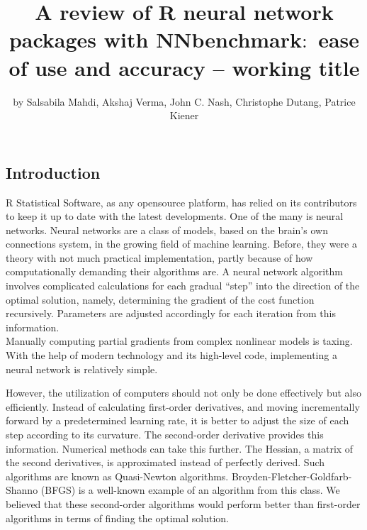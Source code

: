 \title{A review of R neural network packages with NNbenchmark\(:\) ease of use
and accuracy -- working title}
\author{by Salsabila Mahdi, Akshaj Verma, John C. Nash, Christophe Dutang, Patrice Kiener}

\maketitle


\hypertarget{introduction}{%
\subsection{Introduction}\label{introduction}}

R Statistical Software, as any opensource platform, has relied on its
contributors to keep it up to date with the latest developments. One of
the many is neural networks. Neural networks are a class of models,
based on the brain's own connections system, in the growing field of
machine learning. Before, they were a theory with not much practical
implementation, partly because of how computationally demanding their
algorithms are. A neural network algorithm involves complicated
calculations for each gradual ``step'' into the direction of the optimal
solution, namely, determining the gradient of the cost function
recursively. Parameters are adjusted accordingly for each iteration from
this information.\\
Manually computing partial gradients from complex nonlinear models is
taxing. With the help of modern technology and its high-level code,
implementing a neural network is relatively simple.

However, the utilization of computers should not only be done
effectively but also efficiently. Instead of calculating first-order
derivatives, and moving incrementally forward by a predetermined
learning rate, it is better to adjust the size of each step according to
its curvature. The second-order derivative provides this information.
Numerical methods can take this further. The Hessian, a matrix of the
second derivatives, is approximated instead of perfectly derived. Such
algorithms are known as Quasi-Newton algorithms.
Broyden-Fletcher-Goldfarb-Shanno (BFGS) is a well-known example of an
algorithm from this class. We believed that these second-order
algorithms would perform better than first-order algorithms in terms of
finding the optimal solution.

